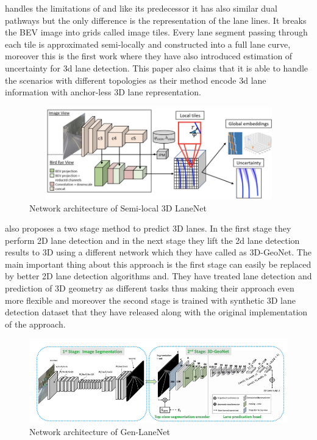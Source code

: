 \cite{DBLP:journals/corr/abs-2011-01535} handles the limitations of \cite{DBLP:journals/corr/abs-1811-10203} and like its predecessor it has also similar dual pathways but the only difference is the representation of the lane lines. It breaks the BEV image into grids called image tiles.
Every lane segment passing through each tile is approximated semi-locally and constructed into a full lane curve, moreover this is the first work where they have also introduced estimation of uncertainty for 3d lane detection. This paper also claims that it is able to handle the scenarios with different topologies as their method encode 3d lane information with anchor-less 3D lane representation. 

 \begin{figure}[h]
    \centering
    \includegraphics[width=12cm, height=4cm]{images/3DLaneNET++.png}
    \caption{Network architecture of Semi-local 3D LaneNet \cite{DBLP:journals/corr/abs-2011-01535}}
    \end{figure}

\cite{guo2020gen} also proposes a two stage method to predict 3D lanes. In the first stage they perform 2D lane detection and in the next stage they lift the 2d lane detection results to 3D using a different network which they have called as 3D-GeoNet. The main important thing about this approach is the first stage can easily be replaced by better 2D lane detection algorithms and. They have treated lane detection and prediction of 3D geometry as different tasks thus making their approach even more flexible and moreover the second stage is trained with synthetic 3D lane detection dataset that they have released along with the original implementation of the approach. 

 \begin{figure}[h]
    \centering
    \includegraphics[width=\textwidth]{images/GenLaneNET.png}
    \caption{Network architecture of Gen-LaneNet \cite{guo2020gen}}
    \end{figure}

